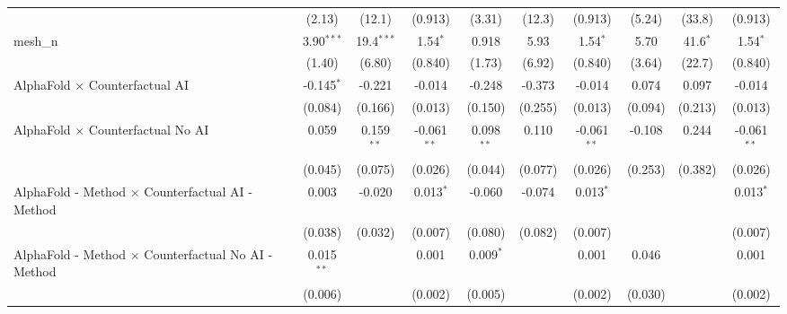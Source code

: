 \begin{tabular}{lccccccccc}
                                                               & (2.13)        & (12.1)        & (0.913)        & (3.31)        & (12.3)       & (0.913)        & (5.24)       & (33.8)       & (0.913)\\   
   mesh\_n                                                     & 3.90$^{***}$  & 19.4$^{***}$  & 1.54$^{*}$     & 0.918         & 5.93         & 1.54$^{*}$     & 5.70         & 41.6$^{*}$   & 1.54$^{*}$\\   
                                                               & (1.40)        & (6.80)        & (0.840)        & (1.73)        & (6.92)       & (0.840)        & (3.64)       & (22.7)       & (0.840)\\   
   AlphaFold $\times$ Counterfactual AI                        & -0.145$^{*}$  & -0.221        & -0.014         & -0.248        & -0.373       & -0.014         & 0.074        & 0.097        & -0.014\\   
                                                               & (0.084)       & (0.166)       & (0.013)        & (0.150)       & (0.255)      & (0.013)        & (0.094)      & (0.213)      & (0.013)\\   
   AlphaFold $\times$ Counterfactual No AI                     & 0.059         & 0.159$^{**}$  & -0.061$^{**}$  & 0.098$^{**}$  & 0.110        & -0.061$^{**}$  & -0.108       & 0.244        & -0.061$^{**}$\\   
                                                               & (0.045)       & (0.075)       & (0.026)        & (0.044)       & (0.077)      & (0.026)        & (0.253)      & (0.382)      & (0.026)\\   
   AlphaFold - Method $\times$ Counterfactual AI - Method      & 0.003         & -0.020        & 0.013$^{*}$    & -0.060        & -0.074       & 0.013$^{*}$    &              &              & 0.013$^{*}$\\   
                                                               & (0.038)       & (0.032)       & (0.007)        & (0.080)       & (0.082)      & (0.007)        &              &              & (0.007)\\   
   AlphaFold - Method $\times$ Counterfactual No AI - Method   & 0.015$^{**}$  &               & 0.001          & 0.009$^{*}$   &              & 0.001          & 0.046        &              & 0.001\\   
                                                               & (0.006)       &               & (0.002)        & (0.005)       &              & (0.002)        & (0.030)      &              & (0.002)\\   

\end{tabular}

